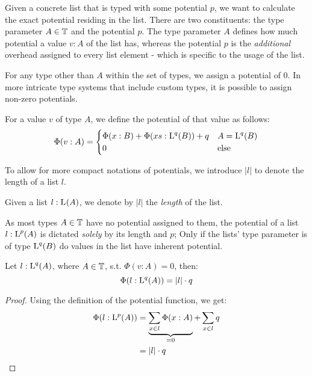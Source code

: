 Given a concrete list that is typed with some potential \(p\), we want to calculate the exact potential residing in the list. There are two constituents: the type parameter \(A \in \mathbb{T}\) and the potential \(p\). The type parameter \(A\) defines how much potential a value \(v : A\) of the list has, whereas the potential \(p\) is the \emph{additional} overhead assigned to every list element - which is specific to the usage of the list.

For any type other than \(A\) within the set of types, we assign a potential of 0. In more intricate type systems that include custom types, it is possible to assign non-zero potentials. 

\begin{definition}\label{def:potential-function}
   For a value \(v\) of type \(A\), we define the potential of that value as follows:
   \[
      \Phi(v : A) = \begin{cases}
         \Phi(x : B) + \Phi(xs : \text{L}^{q}(B)) + q   & A = \text{L}^{q}(B)\\
         0                                            & \text{else}
      \end{cases}
   \]
\end{definition}

To allow for more compact notations of potentials, we introduce \(|l|\) to denote the length of a list \(l\). 

\begin{definition}\label{def:list-length}
   Given a list \(l : \text{L}^{}(A)\), we denote by \(|l|\) the \emph{length} of the list.
\end{definition}

As most types \(A \in \mathbb{T}\) have no potential assigned to them, the potential of a list \(l : \text{L}^{p}(A)\) is dictated \emph{solely} by its length and \(p\); Only if the lists' type parameter is of type \(\text{L}^{q}(B)\) do values in the list have inherent potential.

\begin{corollary}\label{cor:potential-list}
   Let \(l : \text{L}^{q}(A)\), where \(A \in \mathbb{T}\), s.t. \(\Phi(v : A) = 0\), then:
   \[
      \Phi(l : \text{L}^{q}(A)) = |l| \cdot q
   \]
\end{corollary}

\begin{proof}
   Using the definition of the potential function, we get:
   \begin{align*}
      \Phi(l : \text{L}^{p}(A)) &= \underbrace{\sum_{x \in l} \Phi(x : A)}_{=0} + \sum_{x \in l} q \\
                              &= |l| \cdot q
   \end{align*}
\end{proof}

